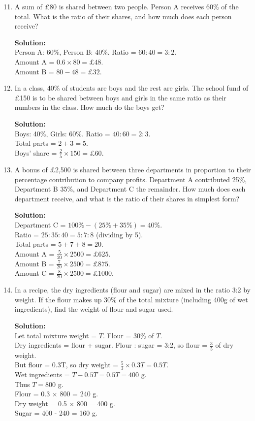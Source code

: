 \documentclass[12pt,a4paper]{article}
\begin{document}
\begin{enumerate}
\setcounter{enumi}{10}

\item A sum of £80 is shared between two people. Person A receives 60\% of the total. What is the ratio of their shares, and how much does each person receive?

\textbf{Solution:}\\
Person A: 60\%, Person B: 40\%. Ratio = \( 60:40 = 3:2 \).\\
Amount A = \( 0.6 \times 80 = £48 \).\\
Amount B = \( 80 - 48 = £32 \).

\item In a class, 40\% of students are boys and the rest are girls. The school fund of £150 is to be shared between boys and girls in the same ratio as their numbers in the class. How much do the boys get?

\textbf{Solution:}\\
Boys: 40\%, Girls: 60\%. Ratio = \( 40:60 = 2:3 \).\\
Total parts = \( 2+3 = 5 \).\\
Boys' share = \( \frac{2}{5} \times 150 = £60 \).

\item A bonus of £2,500 is shared between three departments in proportion to their percentage contribution to company profits. Department A contributed 25\%, Department B 35\%, and Department C the remainder. How much does each department receive, and what is the ratio of their shares in simplest form?

\textbf{Solution:}\\
Department C = \( 100\% - (25\% + 35\%) = 40\% \).\\
Ratio = \( 25:35:40 = 5:7:8 \) (dividing by 5).\\
Total parts = \( 5+7+8 = 20 \).\\
Amount A = \( \frac{5}{20} \times 2500 = £625 \).\\
Amount B = \( \frac{7}{20} \times 2500 = £875 \).\\
Amount C = \( \frac{8}{20} \times 2500 = £1000 \).

\item In a recipe, the dry ingredients (flour and sugar) are mixed in the ratio 3:2 by weight. If the flour makes up 30\% of the total mixture (including 400g of wet ingredients), find the weight of flour and sugar used.

\textbf{Solution:}\\
Let total mixture weight = \( T \). Flour = 30\% of \( T \).\\
Dry ingredients = flour + sugar. Flour : sugar = 3:2, so flour = \( \frac{3}{5} \) of dry weight.\\
But flour = 0.3T, so dry weight = \( \frac{5}{3} \times 0.3T = 0.5T \).\\
Wet ingredients = \( T - 0.5T = 0.5T = 400 \) g.\\
Thus \( T = 800 \) g.\\
Flour = 0.3 × 800 = 240 g.\\
Dry weight = 0.5 × 800 = 400 g.\\
Sugar = 400 - 240 = 160 g.


\end{enumerate}
\end{document}
